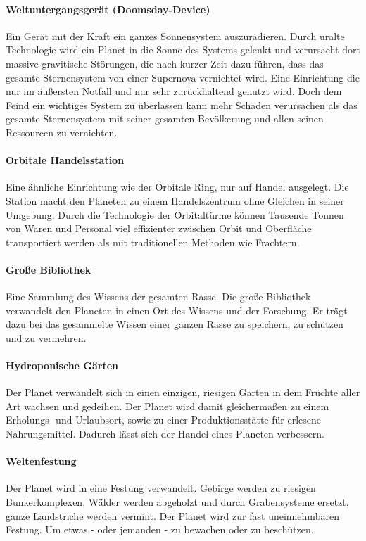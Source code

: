 \documentclass[11pt, a4paper]{article}
\begin{document}
\paragraph{Weltuntergangsgerät (Doomsday-Device)}
Ein Gerät mit der Kraft ein ganzes Sonnensystem auszuradieren. Durch uralte Technologie wird ein Planet in die
Sonne des Systems gelenkt und verursacht dort massive gravitische Störungen, die nach kurzer Zeit dazu führen,
dass das gesamte Sternensystem von einer Supernova vernichtet wird. Eine Einrichtung die nur im äußersten Notfall
und nur sehr zurückhaltend genutzt wird. Doch dem Feind ein wichtiges System zu überlassen kann mehr Schaden
verursachen als das gesamte Sternensystem mit seiner gesamten Bevölkerung und allen seinen Ressourcen zu 
vernichten.

\paragraph{Orbitale Handelsstation}
Eine ähnliche Einrichtung wie der Orbitale Ring, nur auf Handel ausgelegt. Die Station macht den Planeten
zu einem Handelszentrum ohne Gleichen in seiner Umgebung. Durch die Technologie der Orbitaltürme können 
Tausende Tonnen von Waren und Personal viel effizienter zwischen Orbit und Oberfläche transportiert werden
als mit traditionellen Methoden wie Frachtern.

\paragraph{Große Bibliothek}
Eine Sammlung des Wissens der gesamten Rasse. Die große Bibliothek verwandelt den Planeten in einen Ort des 
Wissens und der Forschung. Er trägt dazu bei das gesammelte Wissen einer ganzen Rasse zu speichern, zu schützen 
und zu vermehren.

\paragraph{Hydroponische Gärten}
Der Planet verwandelt sich in einen einzigen, riesigen Garten in dem Früchte aller Art wachsen und gedeihen.
Der Planet wird damit gleichermaßen zu einem Erholungs- und Urlaubsort, sowie zu einer Produktionsstätte für 
erlesene Nahrungsmittel. Dadurch lässt sich der Handel eines Planeten verbessern.

\paragraph{Weltenfestung}
Der Planet wird in eine Festung verwandelt. Gebirge werden zu riesigen Bunkerkomplexen, Wälder werden abgeholzt 
und durch Grabensysteme ersetzt, ganze Landstriche werden vermint. Der Planet wird zur fast uneinnehmbaren 
Festung. Um etwas - oder jemanden - zu bewachen oder zu beschützen.
\end{document}
